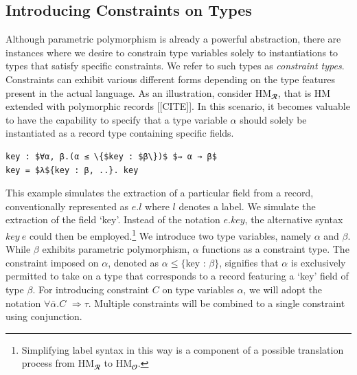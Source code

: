 \documentclass[runningheads]{llncs}
\begin{document}
\subsection{Introducing Constraints on Types}
Although parametric polymorphism is already a powerful abstraction, there are
instances where we desire to constrain type variables solely to instantiations
to types that satisfy specific constraints.
We refer to such types as \emph{constraint types}.
Constraints can exhibit various different forms depending on the type features
present in the actual language.
As an illustration, consider HM$_𝓡$, that is HM extended with
polymorphic records [[CITE]].
In this scenario, it becomes valuable to have the capability to specify that a
type variable $α$
should solely be instantiated as a record type containing specific fields.
\begin{example}
  \begin{lstlisting}
key : $∀α, β.(α ≤ \{$key : $β\})$ $⇒ α → β$
key = $λ${key : β, ..}. key
  \end{lstlisting}
\end{example}
This example simulates the extraction of a particular field from a record,
conventionally
represented as $e.l$ where $l$ denotes a label.
We simulate the extraction of  the field `key'.
Instead of the notation $e.key$, the alternative syntax $key \ e$ could then be
employed.\footnote{
  Simplifying label syntax in this way is a component of a possible translation
  process from HM$_𝓡$ to HM$_𝓞$.

}
We introduce two type variables, namely $α$ and $β$. While $β$ exhibits
parametric polymorphism, $α$ functions as a constraint type.
The constraint imposed on $α$, denoted as $α ≤ \{$key : $β\}$, signifies that
$α$ is exclusively permitted to take on a type that corresponds to a record
featuring a `key' field of type $β$.
For introducing constraint $C$ on type variables $α$, we will adopt the
notation $∀\bar{α}.C$ $⇒ τ$.
Multiple constraints will be combined to a single
constraint using conjunction.
\end{document}
